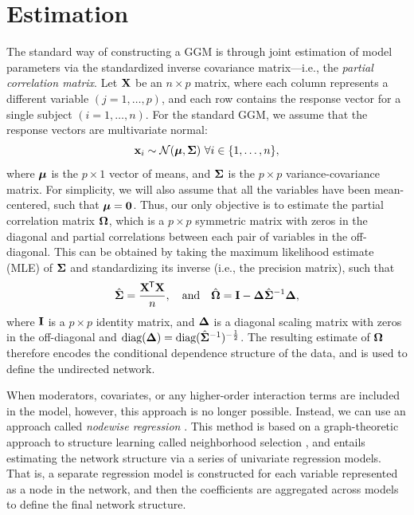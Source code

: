 \section{Estimation}
The standard way of constructing a GGM is through joint estimation of model parameters via the standardized inverse covariance matrix---i.e., the \textit{partial correlation matrix}. Let $\mathbf{X}$ be an $n \times p$ matrix, where each column represents a different variable $(j = 1,\ldots,p)$, and each row contains the response vector for a single subject $(i = 1,\ldots,n)$. For the standard GGM, we assume that the response vectors are multivariate normal:
\begin{equation} \label{mvn}
    \mathbf{x}_i \sim \mathcal{N}(\bm{\mu}, \bm{\Sigma})\ \forall i\in\{1,\ldots,n\},
\end{equation}
where $\bm{\mu}$ is the $p \times 1$ vector of means, and $\bm{\Sigma}$ is the $p \times p$ variance-covariance matrix. For simplicity, we will also assume that all the variables have been mean-centered, such that $\bm{\mu} = \mathbf{0}$. Thus, our only objective is to estimate the partial correlation matrix $\bm{\Omega}$, which is a $p \times p$ symmetric matrix with zeros in the diagonal and partial correlations between each pair of variables in the off-diagonal. This can be obtained by taking the maximum likelihood estimate (MLE) of $\bm{\Sigma}$ and standardizing its inverse (i.e., the precision matrix), such that
\begin{equation} \label{ggm}
    \hat{\bm{\Sigma}} = \frac{\mathbf{X}^{\mkern-1.5mu\mathsf{T}}\mathbf{X}}{n},\quad\text{and}\quad \hat{\bm{\Omega}} = \mathbf{I} - \bm{\Delta} \hat{\bm{\Sigma}}^{-1} \bm{\Delta},
\end{equation}
where $\mathbf{I}$ is a $p \times p$ identity matrix, and $\bm{\Delta}$ is a diagonal scaling matrix with zeros in the off-diagonal and $\text{diag}(\bm{\Delta}) = \text{diag}(\hat{\bm{\Sigma}}^{-1})^{-\frac{1}{2}}$. The resulting estimate of $\bm{\Omega}$ therefore encodes the conditional dependence structure of the data, and is used to define the undirected network. 

When moderators, covariates, or any higher-order interaction terms are included in the model, however, this approach is no longer possible. Instead, we can use an approach called \textit{nodewise regression} \cite{haslbeck2015mgm,epskamp2018gaussian}. This method is based on a graph-theoretic approach to structure learning called neighborhood selection \cite{meinshausen2006high}, and entails estimating the network structure via a series of univariate regression models. That is, a separate regression model is constructed for each variable represented as a node in the network, and then the coefficients are aggregated across models to define the final network structure.

